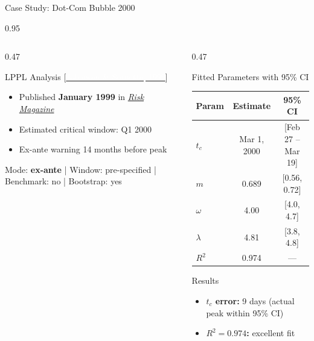 \documentclass[9pt, aspectratio=169, t]{beamer}
\begin{document}
\begin{frame}{Case Study: Dot-Com Bubble 2000}
\begin{cminipage}{0.95\textwidth}
{\begin{columns}[T]
\begin{column}{0.47\textwidth}
            \begin{exampleblock}{LPPL Analysis {\scriptsize[\href{https://doi.org/10.48550/arXiv.cond-mat/9903321}{\textcolor{white}{Johansen \& Sornette, 1999}}]}}
                \begin{itemize}\setlength{\itemsep}{0pt}
                    \item Published \textbf{January 1999} in \href{https://www.risk.net}{\textit{Risk Magazine}}
                    \item Estimated critical window: Q1 2000
                    \item Ex-ante warning 14 months before peak
                \end{itemize}
            \end{exampleblock}
            \vspace{-2mm}
            {\scriptsize\textcolor{MediumGray}{Mode: \textbf{ex-ante} | Window: pre-specified | Benchmark: no | Bootstrap: yes}}
        \end{column}
        \begin{column}{0.47\textwidth}
            \begin{alertblock}{Fitted Parameters with 95\% CI}
                \begin{center}
                    \begin{tabular}{lcc}
                        \toprule
                        \textbf{Param} & \textbf{Estimate} & \textbf{95\% CI} \\
                        \midrule
                        $t_c$ & Mar 1, 2000 & [Feb 27 -- Mar 19] \\
                        $m$ & 0.689 & [0.56, 0.72] \\
                        $\omega$ & 4.00 & [4.0, 4.7] \\
                        $\lambda$ & 4.81 & [3.8, 4.8] \\
                        $R^2$ & 0.974 & --- \\
                        \bottomrule
                    \end{tabular}
                \end{center}
            \end{alertblock}

            \begin{exampleblock}{Results}
                \begin{itemize}\setlength{\itemsep}{0pt}
                    \item \textbf{$t_c$ error:} 9 days (actual peak within 95\% CI)
                    \item \textbf{$R^2 = 0.974$:} excellent fit
                \end{itemize}
            \end{exampleblock}
        \end{column}
    \end{columns}
    }
    \end{cminipage}
\end{frame}
\end{document}
